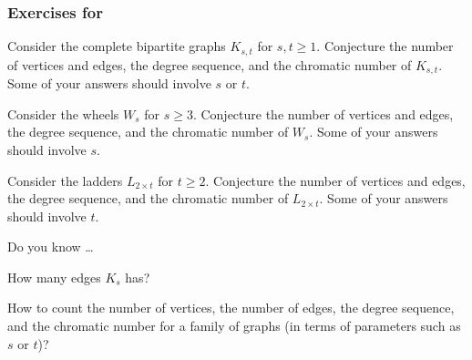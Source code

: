 
\subsubsection*{Exercises for  \subgraphconj}

\begin{exer}[\exerP] %
\label{exer_graph_conjecture_Kbst}
    Consider the complete bipartite graphs $K_{s,t}$ for $s,t \ge 1$. Conjecture the number of vertices and edges, the degree sequence, and the chromatic number of $K_{s,t}$. Some of your answers should involve $s$ or $t$.
\end{exer}

\begin{exer}[\exerU] %
\label{exer_graph_conj_wheels}
    Consider the wheels $W_s$ for $s \ge 3$. Conjecture the number of vertices and edges, the degree sequence, and the chromatic number of $W_s$. Some of your answers should involve $s$.  
\end{exer}

\begin{exer}[\exerU] 
\label{exer_graph_conj_ladders}
    Consider the ladders $L_{2 \times t}$ for $t \ge 2$. Conjecture the number of vertices and edges, the degree sequence, and the chromatic number of $L_{2 \times t}$. Some of your answers should involve $t$.
\end{exer}

\begin{exer}[\exerR] %
\label{exer_dyk_graph_conj}
    Do you know \ldots
        \begin{exerpart}
            \item How many edges $K_s$ has?
            \item How to count the number of vertices, the number of edges, the degree sequence, and the chromatic number for a family of graphs (in terms of parameters such as $s$ or $t$)?
        \end{exerpart}
\end{exer}

